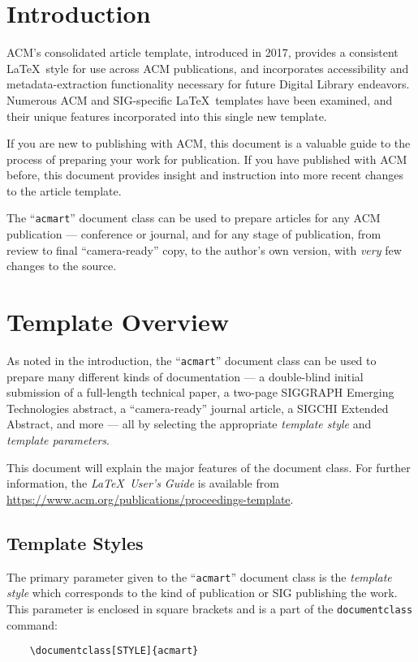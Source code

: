 \documentclass[acmtog]{acmart}
\begin{document}
	\section{Introduction}
	ACM's consolidated article template, introduced in 2017, provides a
	consistent \LaTeX\ style for use across ACM publications, and
	incorporates accessibility and metadata-extraction functionality
	necessary for future Digital Library endeavors. Numerous ACM and
	SIG-specific \LaTeX\ templates have been examined, and their unique
	features incorporated into this single new template.
	
	If you are new to publishing with ACM, this document is a valuable
	guide to the process of preparing your work for publication. If you
	have published with ACM before, this document provides insight and
	instruction into more recent changes to the article template.
	
	The ``\verb|acmart|'' document class can be used to prepare articles
	for any ACM publication --- conference or journal, and for any stage
	of publication, from review to final ``camera-ready'' copy, to the
	author's own version, with {\itshape very} few changes to the source.
	
	\section{Template Overview}
	As noted in the introduction, the ``\verb|acmart|'' document class can
	be used to prepare many different kinds of documentation --- a
	double-blind initial submission of a full-length technical paper, a
	two-page SIGGRAPH Emerging Technologies abstract, a ``camera-ready''
	journal article, a SIGCHI Extended Abstract, and more --- all by
	selecting the appropriate {\itshape template style} and {\itshape
		template parameters}.
	
	This document will explain the major features of the document
	class. For further information, the {\itshape \LaTeX\ User's Guide} is
	available from
	\url{https://www.acm.org/publications/proceedings-template}.
	
	\subsection{Template Styles}
	
	The primary parameter given to the ``\verb|acmart|'' document class is
	the {\itshape template style} which corresponds to the kind of publication
	or SIG publishing the work. This parameter is enclosed in square
	brackets and is a part of the {\verb|documentclass|} command:
	\begin{verbatim}
	\documentclass[STYLE]{acmart}
	\end{verbatim}
	
\end{document}
